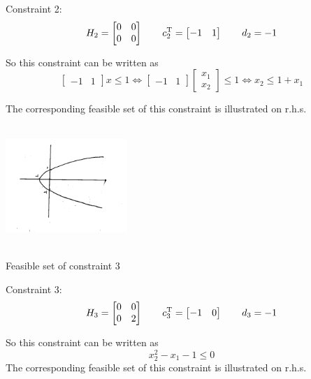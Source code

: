 \begin{example}
Constraint 2:
\begin{equation*}
H_2=
\begin{bmatrix}
0 & 0\\
0 & 0
\end{bmatrix}
\qquad
c_2^{{\rm T}} = 
\begin{bmatrix}
-1 & 1
\end{bmatrix}
\qquad
d_2 = -1
\end{equation*}

So this constraint can be written as
\begin{equation*}
\begin{bmatrix}
-1 & 1
\end{bmatrix}x\leq 1\Leftrightarrow
\begin{bmatrix}
-1 & 1
\end{bmatrix}
\begin{bmatrix}
x_1\\
x_2
\end{bmatrix}\leq 1\Leftrightarrow x_2\leq 1 + x_1
\end{equation*}

The corresponding feasible set of this constraint is illustrated on r.h.s.

\begin{marginfigure}
	\centering
	\includegraphics[width=1.8in,height=1.8in]{figures/ch07/figure1021_4.png}
	\caption{Feasible set of constraint 3} 
\end{marginfigure}

Constraint 3:
\begin{equation*}
H_3=
\begin{bmatrix}
0 & 0\\
0 & 2
\end{bmatrix}
\qquad
c_3^{{\rm T}} = 
\begin{bmatrix}
-1 & 0
\end{bmatrix}
\qquad
d_3 = -1 
\end{equation*}

So this constraint can be written as
$$x^2_2 - x_1 - 1\leq 0$$
The corresponding feasible set of this constraint is illustrated on r.h.s.



\end{example}
